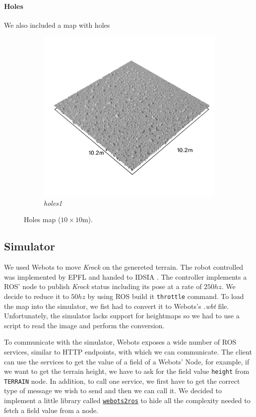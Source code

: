 \documentclass[../document.tex]{subfiles}
\begin{document}
\paragraph{Holes} We also included a map with holes
\begin{figure}[H]
    \centering
        \begin{subfigure}[b]{0.32\textwidth}
            \includegraphics[width=\textwidth]{../img/hm3d_borders/holes1.png}
            \caption{\emph{holes1}}
        \end{subfigure}
\caption{Holes map ($10\times10$m).}
\end{figure}
\subsection{Simulator}
We used Webots to move \emph{Krock} on the genereted terrain. The robot controlled was implemented by EPFL  and handed to IDSIA . The controller implements a ROS' node to publish \emph{Krock} status including its pose at a rate of $250hz$. We decide to reduce it to $50hz$ by using ROS build it \texttt{throttle} command. 
To load the map into the simulator, we fist had to convert it to Webots's \emph{.wbt} file. Unfortunately, the simulator lacks support for heightmaps so we had to use a script to read the image and perform the conversion.

To communicate with the simulator, Webots exposes a wide number of ROS services, similar to HTTP endpoints, with which we can communicate. The client can use the services to get the value of a field of a Webots' Node, for example, if we want to get the terrain height, we have to ask for the field value \texttt{height} from \texttt{TERRAIN} node. In addition, to call one service, we first have to get the correct type of message we wish to send and then we can call it. We decided to implement a little library called \href{https://github.com/FrancescoSaverioZuppichini/Master-Thesis/tree/master/core/utilities/webots2ros}{\texttt{webots2ros}} to hide all the complexity needed to fetch a field value from a node.
\end{document}
